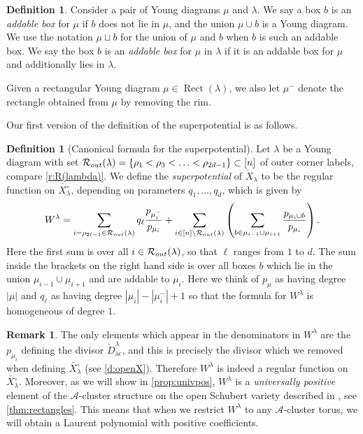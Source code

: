 \documentclass{amsart}
\theoremstyle{definition}
\newtheorem{defn}[thm]{Definition}
\newtheorem{remark}[thm]{Remark}
\numberwithin{equation}{section}
\def\Rect{\operatorname{Rect}}
\newcommand{\Rout}{\mathcal R_{\rm{out}}}
\newcommand{\checkD}{\check{D}}
\newcommand{\ac}{\operatorname{ac}}
\begin{document}
\begin{defn}\label{d:addable}
Consider a pair of Young diagrams $\mu$ and $\lambda$. 
We say a box $b$ is an \emph{addable box} for $\mu$ if $b$ does not lie in $\mu$, and the union $\mu\cup b$ is a Young diagram. We use the notation $\mu\sqcup b$ for the union of $\mu$ and $b$ when $b$ is such an addable box. 
We say the box $b$ is an \emph{addable box} for $\mu$ in $\lambda$ if it is an addable box for $\mu$ and additionally lies in $\lambda$.

Given a rectangular Young diagram $\mu \in \Rect(\lambda)$, we also let 
$\mu^-$ denote the rectangle obtained from $\mu$ by removing the rim.
\end{defn}


Our first version of the definition of the superpotential is as follows.

\begin{defn}[Canonical formula for the superpotential]\label{d:LG1}
Let $\lambda$ be a Young diagram with set $\Rout(\lambda)=\{\rho_1<\rho_3<\dotsc<\rho_{2d-1}\} \subset [n]$ of outer corner labels, compare \cref{r:R(lambda)}. 
We define the \emph{superpotential} of 
	$\check{X}_\lambda$ 
	to be the  regular function on 
$\check{X_{\lambda}^{\circ}}$, 
	depending on parameters $q_1,\dotsc, q_d$, which is given by 
\begin{equation}
	\label{e:Wq1}
	W^{\lambda} 
	= 
	\sum_{i=\rho_{2\ell-1} \in \Rout(\lambda)}	q_\ell \frac{p_{\mu_i^-}}{p_{\mu_i}}+
	\sum_{i\in [n]\setminus \Rout(\lambda)}
	\left(\sum_{b\in\mu_{i-1}\cup\mu_{i+1}} \frac{p_{\mu_i\sqcup b}}{p_{\mu_i}}\right).
\end{equation}
Here the first sum is over all $i\in\Rout(\lambda)$, so that $\ell$ ranges from $1$ to $d$.
	The sum inside the brackets on the right hand side is over all boxes $b$  which  lie in the union $\mu_{i-1}\cup\mu_{i+1}$ and are addable to $\mu_i$. 
	Here we think of $p_\mu$ as having degree $|\mu|$ and  
	$q_\ell$ as having degree $|\mu_{i}| - |\mu_{i}^-|+1$ so that the formula for $W^{\lambda}$ is homogeneous of degree $1$.

\end{defn}


\begin{remark}
The only elements which appear in the denominators in $W^{\lambda}$ are 
	the $p_{\mu_i}$ defining the divisor $\checkD_{\ac}^{\lambda}$, and this is precisely the
divisor	which we removed when defining 
$\check{X_{\lambda}^{\circ}}$
	(see \cref{d:openX}). 
Therefore $W^{\lambda}$ is indeed a regular function on 
$\check{X_{\lambda}^{\circ}}$.
Moreover, as we will show in \cref{prop:univpos},
	$W^{\lambda}$ is a \emph{universally positive} element of 
the $\mathcal{A}$-cluster structure on the open Schubert variety 
described in \cite{SSW}, see \cref{thm:rectangles}.
	This means that when we restrict $W^{\lambda}$
	to any $\mathcal{A}$-cluster torus, we will obtain
	a Laurent polynomial with positive coefficients.
\end{remark}
\end{document}
